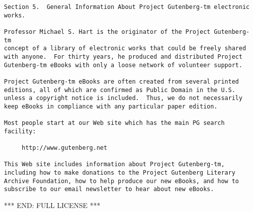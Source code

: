 \documentclass[oneside,12pt]{book}
\begin{document}
\begin{verbatim}
Section 5.  General Information About Project Gutenberg-tm electronic
works.

Professor Michael S. Hart is the originator of the Project Gutenberg-tm
concept of a library of electronic works that could be freely shared
with anyone.  For thirty years, he produced and distributed Project
Gutenberg-tm eBooks with only a loose network of volunteer support.

Project Gutenberg-tm eBooks are often created from several printed
editions, all of which are confirmed as Public Domain in the U.S.
unless a copyright notice is included.  Thus, we do not necessarily
keep eBooks in compliance with any particular paper edition.

Most people start at our Web site which has the main PG search facility:

     http://www.gutenberg.net

This Web site includes information about Project Gutenberg-tm,
including how to make donations to the Project Gutenberg Literary
Archive Foundation, how to help produce our new eBooks, and how to
subscribe to our email newsletter to hear about new eBooks.
\end{verbatim}

*** END: FULL LICENSE ***
\end{document}
